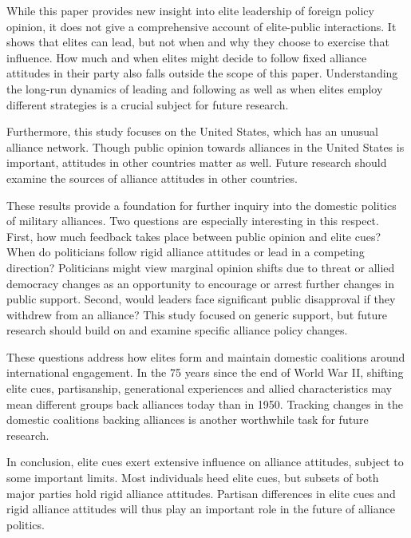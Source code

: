 \documentclass[12pt]{article}
\begin{document}
While this paper provides new insight into elite leadership of foreign policy opinion, it does not give a comprehensive account of elite-public interactions.
It shows that elites can lead, but not when and why they choose to exercise that influence. 
How much and when elites might decide to follow fixed alliance attitudes in their party also falls outside the scope of this paper. 
Understanding the long-run dynamics of leading and following as well as when elites employ different strategies is a crucial subject for future research. 


Furthermore, this study focuses on the United States, which has an unusual alliance network. 
Though public opinion towards alliances in the United States is important, attitudes in other countries matter as well. 
Future research should examine the sources of alliance attitudes in other countries. 


These results provide a foundation for further inquiry into the domestic politics of military alliances. 
Two questions are especially interesting in this respect.
First, how much feedback takes place between public opinion and elite cues? 
When do politicians follow rigid alliance attitudes or lead in a competing direction? 
Politicians might view marginal opinion shifts due to threat or allied democracy changes as an opportunity to encourage or arrest further changes in public support.
Second, would leaders face significant public disapproval if they withdrew from an alliance? 
This study focused on generic support, but future research should build on \citet{TomzWeeks2021} and examine specific alliance policy changes. 


These questions address how elites form and maintain domestic coalitions around international engagement. 
In the 75 years since the end of World War II, shifting elite cues, partisanship, generational experiences and allied characteristics may mean different groups back alliances today than in 1950. 
Tracking changes in the domestic coalitions backing alliances is another worthwhile task for future research.


In conclusion, elite cues exert extensive influence on alliance attitudes, subject to some important limits.
Most individuals heed elite cues, but subsets of both major parties hold rigid alliance attitudes. 
Partisan differences in elite cues and rigid alliance attitudes will thus play an important role in the future of alliance politics.



\newpage

 
 
\end{document}
